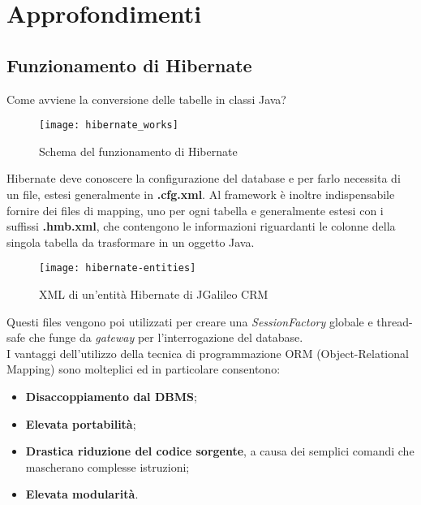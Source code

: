 
\chapter{Approfondimenti}

\section{Funzionamento di Hibernate} 
\label{sec:appendice-1}
Come avviene la conversione delle tabelle in classi Java?\\
\begin{figure}[h]
	\centering
	\texttt{[image: hibernate\_works]}
	\caption{Schema del funzionamento di Hibernate}
	\label{schema-generale-hibernate}
\end{figure}
Hibernate deve conoscere la configurazione del database e per farlo necessita di un file, estesi generalmente in \textbf{.cfg.xml}. Al framework è inoltre indispensabile fornire dei files di mapping, uno per ogni tabella e generalmente estesi con i suffissi \textbf{.hmb.xml}, che contengono le informazioni riguardanti le colonne della singola tabella da trasformare in un oggetto Java.\\

\begin{figure}[h]
	\centering
	\texttt{[image: hibernate-entities]}
	\caption{XML di un'entità Hibernate di JGalileo CRM}
	\label{entità}
\end{figure}

Questi files vengono poi utilizzati per creare una \emph{SessionFactory} globale e thread-safe che funge da \emph{gateway} per l'interrogazione del database. \\ I vantaggi dell'utilizzo della tecnica di programmazione ORM (Object-Relational Mapping) sono molteplici ed in particolare consentono:
\begin{itemize}
	\item \textbf{Disaccoppiamento dal DBMS};
	\item \textbf{Elevata portabilità};
	\item \textbf{Drastica riduzione del codice sorgente}, a causa dei semplici comandi che mascherano complesse istruzioni;
	\item \textbf{Elevata modularità}.
\end{itemize}

